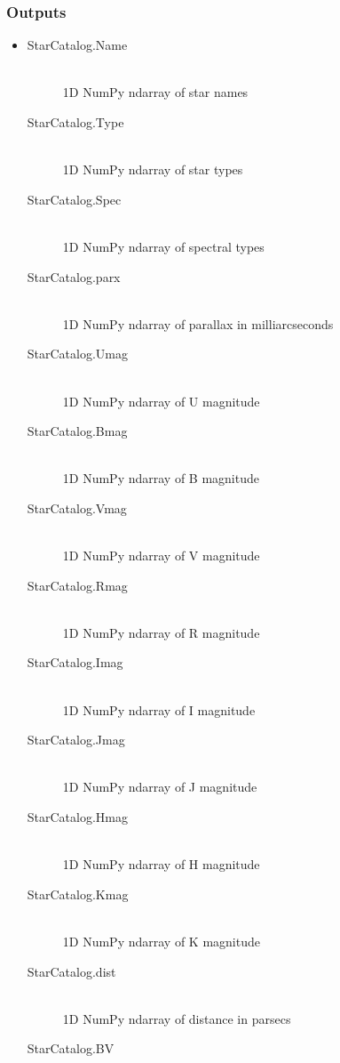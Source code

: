 \documentclass[cleanfoot]{asme2ej}
\begin{document}
\subsubsection*{Outputs}
\begin{itemize}
    \item 
    \begin{description}
        \item[StarCatalog.Name] \hfill \\
        1D NumPy ndarray of star names
        \item[StarCatalog.Type] \hfill \\
        1D NumPy ndarray of star types
        \item[StarCatalog.Spec] \hfill \\
        1D NumPy ndarray of spectral types
        \item[StarCatalog.parx] \hfill \\
        1D NumPy ndarray of parallax in milliarcseconds
        \item[StarCatalog.Umag] \hfill \\
        1D NumPy ndarray of U magnitude
        \item[StarCatalog.Bmag] \hfill \\
        1D NumPy ndarray of B magnitude
        \item[StarCatalog.Vmag] \hfill \\
        1D NumPy ndarray of V magnitude
        \item[StarCatalog.Rmag] \hfill \\
        1D NumPy ndarray of R magnitude
        \item[StarCatalog.Imag] \hfill \\
        1D NumPy ndarray of I magnitude
        \item[StarCatalog.Jmag] \hfill \\
        1D NumPy ndarray of J magnitude
        \item[StarCatalog.Hmag] \hfill \\
        1D NumPy ndarray of H magnitude
        \item[StarCatalog.Kmag] \hfill \\
        1D NumPy ndarray of K magnitude
        \item[StarCatalog.dist] \hfill \\
        1D NumPy ndarray of distance in parsecs
        \item[StarCatalog.BV] \hfill \\

\end{description}
\end{itemize}
\end{document}
